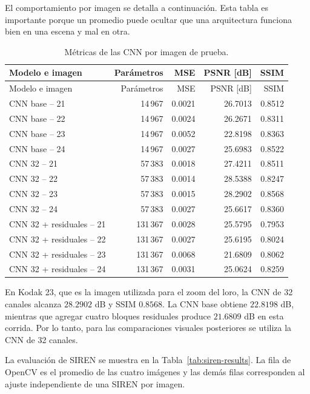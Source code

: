 \documentclass[11pt,a4paper]{article}
\begin{document}
El comportamiento por imagen se detalla a continuación. Esta tabla es importante porque un promedio puede ocultar que una arquitectura funciona bien en una escena y mal en otra.

\begin{longtable}{p{4.4cm}rrrr}
\caption{Métricas de las CNN por imagen de prueba.}\label{tab:cnn-per-image}\\
\toprule
Modelo e imagen & Parámetros & MSE & PSNR [dB] & SSIM\\
\midrule
\endfirsthead
\toprule
Modelo e imagen & Parámetros & MSE & PSNR [dB] & SSIM\\
\midrule
\endhead
CNN base -- 21 & 14\,967 & 0.0021 & 26.7013 & 0.8512\\
CNN base -- 22 & 14\,967 & 0.0024 & 26.2671 & 0.8311\\
CNN base -- 23 & 14\,967 & 0.0052 & 22.8198 & 0.8363\\
CNN base -- 24 & 14\,967 & 0.0027 & 25.6983 & 0.8522\\
\midrule
CNN 32 -- 21 & 57\,383 & 0.0018 & 27.4211 & 0.8511\\
CNN 32 -- 22 & 57\,383 & 0.0014 & 28.5388 & 0.8247\\
CNN 32 -- 23 & 57\,383 & 0.0015 & 28.2902 & 0.8568\\
CNN 32 -- 24 & 57\,383 & 0.0027 & 25.6617 & 0.8360\\
\midrule
CNN 32 + residuales -- 21 & 131\,367 & 0.0028 & 25.5795 & 0.7953\\
CNN 32 + residuales -- 22 & 131\,367 & 0.0027 & 25.6195 & 0.8024\\
CNN 32 + residuales -- 23 & 131\,367 & 0.0068 & 21.6809 & 0.8062\\
CNN 32 + residuales -- 24 & 131\,367 & 0.0031 & 25.0624 & 0.8259\\
\bottomrule
\end{longtable}

En Kodak 23, que es la imagen utilizada para el zoom del loro, la CNN de 32 canales alcanza $28.2902$ dB y SSIM $0.8568$. La CNN base obtiene $22.8198$ dB, mientras que agregar cuatro bloques residuales produce $21.6809$ dB en esta corrida. Por lo tanto, para las comparaciones visuales posteriores se utiliza la CNN de 32 canales.

La evaluación de SIREN se muestra en la Tabla~\ref{tab:siren-results}. La fila de OpenCV es el promedio de las cuatro imágenes y las demás filas corresponden al ajuste independiente de una SIREN por imagen.
\end{document}
